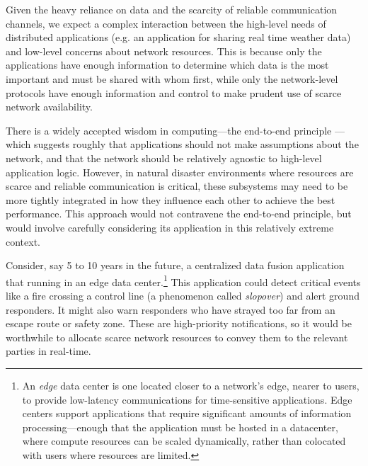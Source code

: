 \documentclass[]             %
{NASA}                       %
\theoremstyle{definition}
\begin{document}
Given the heavy reliance on data and the scarcity of reliable
communication channels, we expect a complex interaction between the
high-level needs of distributed applications (e.g. an application for
sharing real time weather data) and low-level concerns about network
resources. This is because only the applications have enough
information to determine which data is the most important and must be
shared with whom first, while only the network-level protocols have
enough information and control to make prudent use of scarce network
availability.

There is a widely accepted wisdom in computing---the end-to-end
principle \cite{1984:end-to-end}---which suggests roughly that
applications should not make assumptions about the network, and that
the network should be relatively agnostic to high-level application
logic. However, in natural disaster environments where resources are
scarce and reliable communication is critical, these subsystems may
need to be more tightly integrated in how they influence each other to
achieve the best performance. This approach would not contravene the
end-to-end principle, but would involve carefully considering its
application in this relatively extreme context.

Consider, say 5 to 10 years in the future, a centralized data fusion
application that running in an edge data center.\footnote{An
  \emph{edge} data center is one located closer to a network's edge,
  nearer to users, to provide low-latency communications for
  time-sensitive applications. Edge centers support applications that
  require significant amounts of information processing---enough that
  the application must be hosted in a datacenter, where compute
  resources can be scaled dynamically, rather than colocated with
  users where resources are limited.} This application could detect
critical events like a fire crossing a control line (a phenomenon
called \emph{slopover}) and alert ground responders. It might also
warn responders who have strayed too far from an escape route or
safety zone. These are high-priority notifications, so it would be
worthwhile to allocate scarce network resources to convey them to the
relevant parties in real-time.
\end{document}
